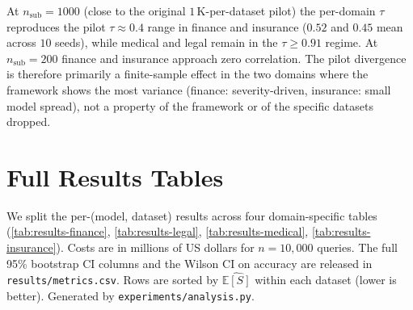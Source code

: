 \documentclass[11pt]{article}
\newcommand{\ES}{\mathbb{E}[S]}
\begin{document}
\begin{center}
\end{center}

\noindent At $n_{\text{sub}} = 1000$ (close to the original
$1$\,K-per-dataset pilot) the per-domain $\tau$ reproduces the
pilot $\tau \approx 0.4$ range in finance and insurance
($0.52$ and $0.45$ mean across $10$ seeds), while medical and
legal remain in the $\tau \geq 0.91$ regime. At
$n_{\text{sub}} = 200$ finance and insurance approach zero
correlation. The pilot divergence is therefore primarily a
finite-sample effect in the two domains where the framework
shows the most variance (finance: severity-driven, insurance:
small model spread), not a property of the framework or of the
specific datasets dropped.

\section{Full Results Tables}
\label{sec:app-full-results}

We split the per-(model, dataset) results across four
domain-specific tables (\autoref{tab:results-finance},
\autoref{tab:results-legal}, \autoref{tab:results-medical},
\autoref{tab:results-insurance}). Costs are in millions of US dollars
for $n{=}10{,}000$ queries. The full 95\% bootstrap CI columns and
the Wilson CI on accuracy are released in
\texttt{results/metrics.csv}. Rows are sorted by $\widehat{\ES}$
within each dataset (lower is better). Generated by
\texttt{experiments/analysis.py}.
\end{document}
